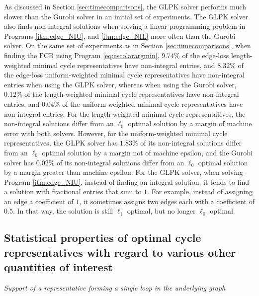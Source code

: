 \documentclass[utf8]{formatting_stuff/frontiersFPHY}
\newcommand{\se}{Section }
\newcommand{\setoffilteredcyclebases}{\mathrm{FCB}}
\newcommand{\pr}{Program }
\theoremstyle{plain}
\theoremstyle{definition}
\begin{document}
As discussed in \se \ref{sec:timecomparisons}, the GLPK solver performs much slower than the Gurobi solver in an initial set of experiments. The GLPK solver also finds non-integral solutions when solving a linear programming problem in Programs
\ref{itm:edge_NIU}, and
\ref{itm:edge_NIL}
 more often than the Gurobi solver. On the same set of experiments as in \se \ref{sec:timecomparisons}, when finding the $\setoffilteredcyclebases$ using \pr \eqref{eq:escolarargmin}, $9.74\%$ of the edge-loss length-weighted minimal cycle representatives have non-integral entries, and $8.32\%$ of the edge-loss uniform-weighted minimal cycle representatives have non-integral entries when using the GLPK solver, whereas when using the Gurobi solver, $0.12\%$ of the length-weighted minimal cycle representatives have non-integral entries, and $0.04\%$ of the uniform-weighted minimal cycle representatives have non-integral entries. For the length-weighted minimal cycle representatives, the non-integral solutions differ from an $\ell_0$ optimal solution by a margin of machine error with both solvers. However, for the uniform-weighted minimal cycle representatives, the GLPK solver has $1.83\%$ of its non-integral solutions differ from an $\ell_0$ optimal solution by a margin not of machine epsilon, and the Gurobi solver has $0.02\%$ of its non-integral solutions differ from an $\ell_0$ optimal solution by a margin greater than machine epsilon. For the GLPK solver, when solving \pr
 \ref{itm:edge_NIU}, instead of finding an integral solution, it tends to find a solution with fractional entries that sum to $1$. For example, instead of assigning an edge a coefficient of $1$, it sometimes assigns two edges each with a coefficient of $0.5$. In that way, the solution is still $\ell_1$ optimal, but no longer $\ell_0$ optimal.\\

\subsection{Statistical properties of optimal cycle representatives with regard to various other quantities of interest}



\noindent \emph{Support of a representative forming a single loop in the underlying graph}
\end{document}

